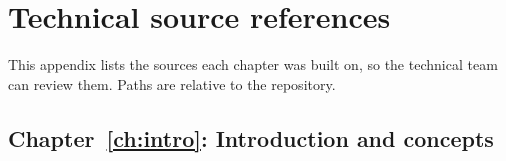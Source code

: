 \chapter{Technical source references}
\label{app:sources}

This appendix lists the sources each chapter was built on, so the technical team can review them.
Paths are relative to the \kos{} repository.

\newcommand{\srcs}[1]{\LR{\parbox[t]{9.9cm}{\raggedright\footnotesize\ttfamily #1}}}

\section{Chapter~\ref{ch:intro}: Introduction and concepts}

